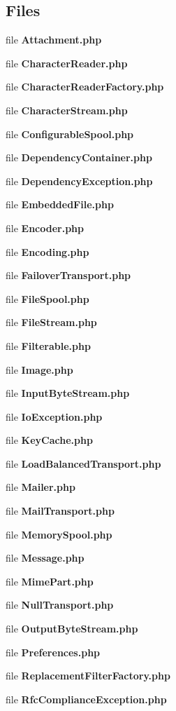 \subsection*{Files}
\begin{DoxyCompactItemize}
\item 
file {\bf Attachment.\+php}
\item 
file {\bf Character\+Reader.\+php}
\item 
file {\bf Character\+Reader\+Factory.\+php}
\item 
file {\bf Character\+Stream.\+php}
\item 
file {\bf Configurable\+Spool.\+php}
\item 
file {\bf Dependency\+Container.\+php}
\item 
file {\bf Dependency\+Exception.\+php}
\item 
file {\bf Embedded\+File.\+php}
\item 
file {\bf Encoder.\+php}
\item 
file {\bf Encoding.\+php}
\item 
file {\bf Failover\+Transport.\+php}
\item 
file {\bf File\+Spool.\+php}
\item 
file {\bf File\+Stream.\+php}
\item 
file {\bf Filterable.\+php}
\item 
file {\bf Image.\+php}
\item 
file {\bf Input\+Byte\+Stream.\+php}
\item 
file {\bf Io\+Exception.\+php}
\item 
file {\bf Key\+Cache.\+php}
\item 
file {\bf Load\+Balanced\+Transport.\+php}
\item 
file {\bf Mailer.\+php}
\item 
file {\bf Mail\+Transport.\+php}
\item 
file {\bf Memory\+Spool.\+php}
\item 
file {\bf Message.\+php}
\item 
file {\bf Mime\+Part.\+php}
\item 
file {\bf Null\+Transport.\+php}
\item 
file {\bf Output\+Byte\+Stream.\+php}
\item 
file {\bf Preferences.\+php}
\item 
file {\bf Replacement\+Filter\+Factory.\+php}
\item 
file {\bf Rfc\+Compliance\+Exception.\+php}
\item 

\end{DoxyCompactItemize}
